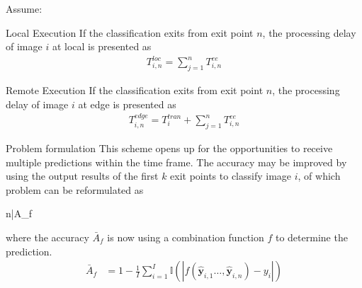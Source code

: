 \begin{enumdescript}
		Assume:
		\begin{enumdescript}
			\item[Local Execution] If the classification exits from exit point $ n $, the processing delay of image $ i $ at local is presented as
			\begin{align}
			T_{i,n}^{loc}=\sum_{j=1}^{n} T^{ee}_{i,n} 
			\end{align}
			\item[Remote Execution] If the classification exits from exit point $ n $, the processing delay of image $ i $ at edge is presented as
			\begin{align}
			T_{i,n}^{edge}=T_{i}^{tran}+\sum_{j=1}^{n} T^{ee}_{i,n}
			\end{align}
		\end{enumdescript}
	
		\item[Problem formulation] 
		This scheme opens up for the opportunities to receive multiple predictions within the time frame. The accuracy may be improved by using the output results of the first $ k $ exit points to classify image $ i $, of which problem can be reformulated as
		\begin{maxi}
			{n}{\bar{A}_f}
			{}{}
		\end{maxi}
		where the accuracy $ \bar{A}_f $ is now using a combination function $ f $ to determine the prediction.
		\begin{align*}
		\bar{A}_f &= 1 - \frac{1}{I} \sum_{i=1}^{I}\mathbb{I}\left(\left|f\left(\mathbf{\hat{y}}_{i,1} \dots, \mathbf{\hat{y}}_{i,n}\right)-y_i\right|\right)
		\end{align*}
		

\end{enumdescript}
